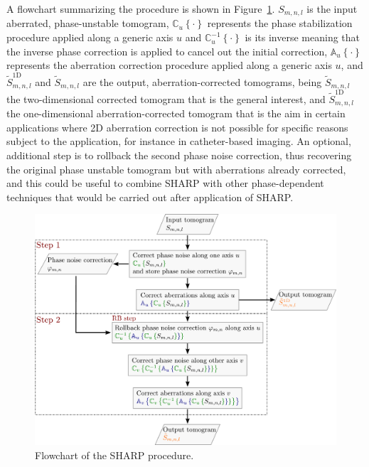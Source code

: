 A flowchart summarizing the procedure is shown in Figure~\ref{fig:SHARPFlowDiag}. $S_{m,n,l}$ is the input aberrated, phase-unstable tomogram, $\mathbb{C}_u\left\{\cdot\right\}$ represents the phase stabilization procedure applied along a generic axis $u$  and $\mathbb{C}_u^{-1}\left\{\cdot\right\}$ is its inverse meaning that the inverse phase correction is applied to cancel out the initial correction, $\mathbb{A}_u\left\{\cdot\right\}$ represents the aberration correction procedure applied along a generic axis $u$, and $\tilde{S}^{\text{1D}}_{m,n,l}$ and $\tilde{S}_{m,n,l}$ are the output, aberration-corrected tomograms, being $\tilde{S}_{m,n,l}$ the two-dimensional corrected tomogram that is the general interest, and $\tilde{S}^{\text{1D}}_{m,n,l}$ the one-dimensional aberration-corrected tomogram that is the aim in certain applications where 2D aberration correction is not possible for specific reasons subject to the application, for instance in catheter-based imaging. An optional, additional step is to rollback the second phase noise correction, thus recovering the original phase unstable tomogram but with aberrations already corrected, and this could be useful to combine SHARP with other phase-dependent techniques that would be carried out after application of SHARP.

\begin{figure}[htb!]
	\centering
	\includegraphics[width=\textwidth]{Figures/SHARP/BlockDiagram.pdf}
	\caption[Flowchart of the SHARP procedure.]{Flowchart of the SHARP procedure.}
	\label{fig:SHARPFlowDiag}
\end{figure}
\FloatBarrier

